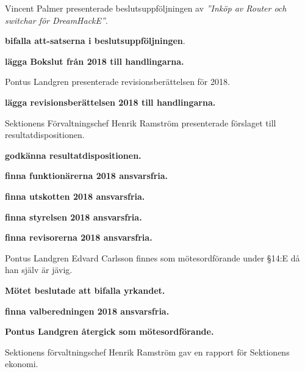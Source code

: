 \documentclass[10pt]{article}
\begin{document}
\begin{paragrafer}
Vincent Palmer presenterade beslutsuppföljningen av \emph{''Inköp av Router och switchar för DreamHackE''}.


\textbf{\Mba bifalla att-satserna i beslutsuppföljningen}.


\textbf{\Mba lägga Bokslut från 2018 till handlingarna.}

Pontus Landgren presenterade revisionsberättelsen för 2018. 

\textbf{\Mba lägga revisionsberättelsen 2018 till handlingarna.}

Sektionens Förvaltningschef Henrik Ramström presenterade förslaget till resultatdispositionen.

\textbf{\Mba godkänna resultatdispositionen.}


  \begin{paragrafer}

    \textbf{\Mba finna funktionärerna 2018 ansvarsfria.}


    \textbf{\Mba finna utskotten 2018 ansvarsfria.}
    
    
    \textbf{\Mba finna styrelsen 2018 ansvarsfria.}
    

    \textbf{\Mba finna revisorerna 2018 ansvarsfria.}

   

    Pontus Landgren \ypa Edvard Carlsson finnes som mötesordförande under \S14:E då han själv är jävig.

    \textbf{Mötet beslutade att bifalla yrkandet.}

    \textbf{\Mba finna valberedningen 2018 ansvarsfria.}

    \textbf{Pontus Landgren återgick som mötesordförande.} 


  \end{paragrafer}

Sektionens förvaltningschef Henrik Ramström gav en rapport för Sektionens ekonomi.


\end{paragrafer}
\end{document}
